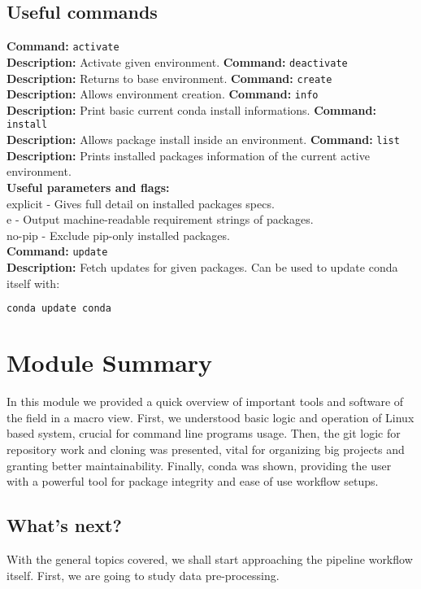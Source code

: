 \documentclass[a4paper,11pt]{article}
\begin{document}
\subsection{Useful commands}
\begin{cheatsheetbox}
\textbf{Command:} \texttt{activate} \\
\textbf{Description:} Activate given environment.
\noindent\makebox[\linewidth]{\dotfill}
\textbf{Command:} \texttt{deactivate} \\
\textbf{Description:} Returns to base environment.
\noindent\makebox[\linewidth]{\dotfill}
\textbf{Command:} \texttt{create} \\
\textbf{Description:} Allows environment creation.
\noindent\makebox[\linewidth]{\dotfill}
\textbf{Command:} \texttt{info} \\
\textbf{Description:} Print basic current conda install informations.
\noindent\makebox[\linewidth]{\dotfill}
\textbf{Command:} \texttt{install} \\
\textbf{Description:} Allows package install inside an environment.
\noindent\makebox[\linewidth]{\dotfill}
\textbf{Command:} \texttt{list} \\
\textbf{Description:} Prints installed packages information of the current
active environment.\\
\textbf{Useful parameters and flags:}\\
explicit - Gives full detail on installed packages specs.\\
e - Output machine-readable requirement strings of packages.\\
no-pip - Exclude pip-only installed packages.\\
\noindent\makebox[\linewidth]{\dotfill}
\textbf{Command:} \texttt{update} \\
\textbf{Description:} Fetch updates for given packages. Can be used to update
conda itself with:\\
\begin{lstlisting}[language=bash]
conda update conda
\end{lstlisting}
\end{cheatsheetbox}
\section{Module Summary}
In this module we provided a quick overview of important tools and software of
the field in a macro view. First, we understood basic logic and operation of
Linux based system, crucial for command line programs usage. Then, the git
logic for repository work and cloning was presented, vital for organizing big
projects and granting better maintainability. Finally, conda was shown,
providing the user with a powerful tool for package integrity and ease of use
workflow setups.
\subsection{What's next?}
With the general topics covered, we shall start approaching the pipeline
workflow itself. First, we are going to study data pre-processing.

\newpage
\printbibliography
\end{document}
